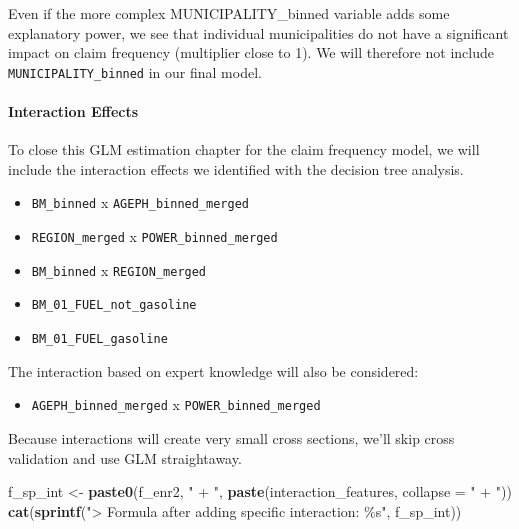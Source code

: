\documentclass[
  english,
  11pt,
]{article}
\newenvironment{Shaded}{\begin{snugshade}}{\end{snugshade}}
\newcommand{\AttributeTok}[1]{\textcolor[rgb]{0.13,0.29,0.53}{#1}}
\newcommand{\FunctionTok}[1]{\textcolor[rgb]{0.13,0.29,0.53}{\textbf{#1}}}
\newcommand{\NormalTok}[1]{#1}
\newcommand{\OtherTok}[1]{\textcolor[rgb]{0.56,0.35,0.01}{#1}}
\newcommand{\StringTok}[1]{\textcolor[rgb]{0.31,0.60,0.02}{#1}}
\providecommand{\tightlist}{%
  \setlength{\itemsep}{0pt}\setlength{\parskip}{0pt}}
\begin{document}
Even if the more complex MUNICIPALITY\_binned variable adds some
explanatory power, we see that individual municipalities do not have a
significant impact on claim frequency (multiplier close to 1). We will
therefore not include \texttt{MUNICIPALITY\_binned} in our final model.

\paragraph{Interaction Effects}\label{interaction-effects}

To close this GLM estimation chapter for the claim frequency model, we
will include the interaction effects we identified with the decision
tree analysis.

\begin{itemize}
\tightlist
\item
  \texttt{BM\_binned} x \texttt{AGEPH\_binned\_merged}
\item
  \texttt{REGION\_merged} x \texttt{POWER\_binned\_merged}
\item
  \texttt{BM\_binned} x \texttt{REGION\_merged}
\item
  \texttt{BM\_01\_FUEL\_not\_gasoline}
\item
  \texttt{BM\_01\_FUEL\_gasoline}
\end{itemize}

The interaction based on expert knowledge will also be considered:

\begin{itemize}
\tightlist
\item
  \texttt{AGEPH\_binned\_merged} x \texttt{POWER\_binned\_merged}
\end{itemize}

Because interactions will create very small cross sections, we'll skip
cross validation and use GLM straightaway.

\begin{Shaded}
\begin{Highlighting}[]
\NormalTok{f\_sp\_int }\OtherTok{\textless{}{-}} \FunctionTok{paste0}\NormalTok{(f\_enr2, }\StringTok{" + "}\NormalTok{, }\FunctionTok{paste}\NormalTok{(interaction\_features, }\AttributeTok{collapse =} \StringTok{" + "}\NormalTok{))}
\FunctionTok{cat}\NormalTok{(}\FunctionTok{sprintf}\NormalTok{(}\StringTok{"\textgreater{} Formula after adding specific interaction: \%s"}\NormalTok{, f\_sp\_int))}
\end{Highlighting}
\end{Shaded}
\end{document}
